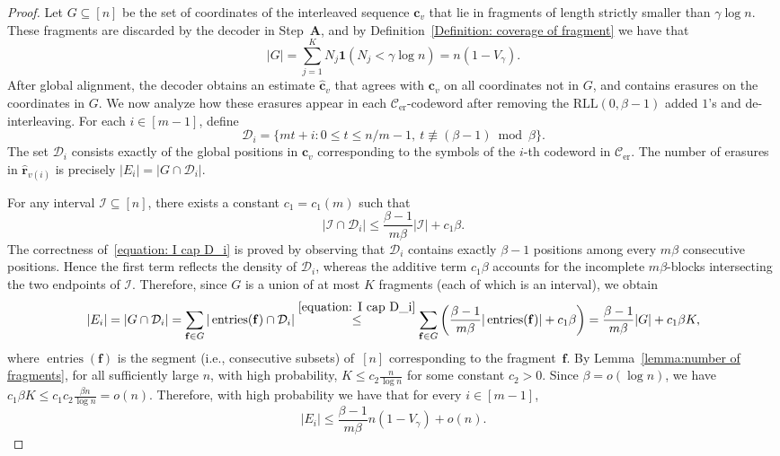 \documentclass[journal,letterpaper,onecolumn,11pt]{IEEEtran}
\newcommand{\cC}{\mathcal{C}}
\newcommand{\cD}{\mathcal{D}}
\newcommand{\cI}{\mathcal{I}}
\newcommand{\boldc}{\mathbf{c}}
\newcommand{\boldf}{\mathbf{f}}
\newcommand{\boldr}{\mathbf{r}}
\begin{document}
\begin{proof}
Let $G\subseteq[n]$ be the set of coordinates of the interleaved sequence $\boldc_v$ that lie in fragments of length strictly smaller than $\gamma\log n$. 
These fragments are discarded by the decoder in Step~$\mathbf{A}$, and by Definition~\ref{Definition: coverage of fragment} we have that
\[
    |G|
    =
    \sum_{j=1}^{K}N_j\mathbf{1}({N_j<\gamma\log n})
    =
    n(1-V_\gamma).
\]
After global alignment, the decoder obtains an estimate $\hat{\boldc}_v$ that agrees with $\boldc_v$ on all coordinates not in $G$, and contains erasures on the coordinates in $G$. 
We now analyze how these erasures appear in each $\cC_{\mathrm{er}}$-codeword after removing the $\mathrm{RLL}(0,\beta-1)$ added $1$'s and de-interleaving.
For each $i\in[m-1]$, define
\[
    \cD_i
    =
    \{mt+i:0\le t\le n/m-1,\ t\not\equiv (\beta-1) \bmod{\beta}\}.
\]
The set $\cD_i$ consists exactly of the global positions in $\boldc_v$ corresponding to the symbols of the $i$-th codeword in $\cC_{\mathrm{er}}$.
The number of erasures in $\hat{\boldr}_{v(i)}$ is precisely $|E_i| = |G\cap \cD_i|$.

For any interval $\cI\subseteq[n]$, there exists a constant $c_1=c_1(m)$ such that 
\begin{equation}\label{equation: I cap D_i}
        |\cI\cap \cD_i|
    \le
    \frac{\beta-1}{m\beta}|\cI|+c_1\beta.
\end{equation}
The correctness of~\eqref{equation: I cap D_i} is proved by observing that \(\cD_i\) contains exactly \(\beta-1\) positions among every
\(m\beta\) consecutive positions. Hence the first term reflects the density of
\(\cD_i\), whereas the additive term \(c_1\beta\) accounts for the incomplete
\(m\beta\)-blocks intersecting the two endpoints of \(\cI\).
Therefore, since $G$ is a union of at most $K$ fragments (each of which is an interval), we obtain
\[
    |E_i| = |G\cap \cD_i|=\sum_{\boldf\in G}|\operatorname{entries}(\boldf)\cap \cD_i| \overset{\eqref{equation: I cap D_i}}{\le}\sum_{\boldf\in G} \left(\frac{\beta-1}{m\beta}|\operatorname{entries}(\boldf)|+c_1\beta\right)
    =
    \frac{\beta-1}{m\beta}|G|+c_1\beta K,
\]
where $\operatorname{entries}(\boldf)$ is the segment (i.e., consecutive subsets) of~$[n]$ corresponding to the fragment~$\boldf$.
By Lemma~\ref{lemma:number of fragments}, for all sufficiently large $n$, with high probability, $K \le c_2\frac{n}{\log n}$ for some constant $c_2>0$. Since $\beta=o(\log n)$, we have $c_1\beta K \le c_1c_2\frac{\beta n}{\log n} = o(n)$.
Therefore, with high probability we have that for every $i\in[m-1]$,
\[
    |E_i|
    \le
    \frac{\beta-1}{m\beta}n(1-V_\gamma)+o(n).
\]


\end{proof}
\end{document}
